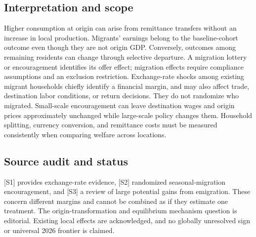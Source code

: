 \documentclass[11pt,a4paper]{article}
\begin{document}
\subsection*{Interpretation and scope}
Higher consumption at origin can arise from remittance transfers without an increase in local production. Migrants' earnings belong to the baseline-cohort outcome even though they are not origin GDP. Conversely, outcomes among remaining residents can change through selective departure. A migration lottery or encouragement identifies its offer effect; migration effects require compliance assumptions and an exclusion restriction. Exchange-rate shocks among existing migrant households chiefly identify a financial margin, and may also affect trade, destination labor conditions, or return decisions. They do not randomize who migrated. Small-scale encouragement can leave destination wages and origin prices approximately unchanged while large-scale policy changes them. Household splitting, currency conversion, and remittance costs must be measured consistently when comparing welfare across locations.
\subsection*{Source audit and status}
[S1] provides exchange-rate evidence, [S2] randomized seasonal-migration encouragement, and [S3] a review of large potential gains from emigration. These concern different margins and cannot be combined as if they estimate one treatment. The origin-transformation and equilibrium mechanism question is editorial. Existing local effects are acknowledged, and no globally unresolved sign or universal 2026 frontier is claimed.
\end{document}
